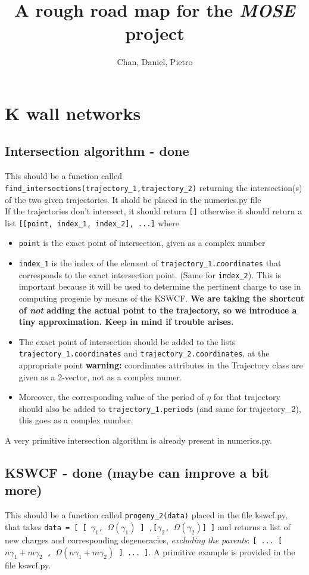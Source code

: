 \documentclass[11pt]{report}
\title{A rough road map for the \emph{MOSE} project}
\author{Chan, Daniel, Pietro}
\begin{document}
\maketitle

\tableofcontents


\chapter{K wall networks}


\section{Intersection algorithm  - {\color{red} \bf done}}
This should be a function called \texttt{find\_intersections(trajectory\_1,trajectory\_2)} returning the intersection(s) of the two given trajectories. It shold be placed in the numerics.py file\\
If the trajectories don't intersect, it should return {\tt []} otherwise it should return a list {\tt [[point, index\_1, index\_2], ...]} where
\begin{itemize}
\item {\tt point} is the exact point of intersection, given as a complex number 
\item {\tt index\_1} is the index of the element of {\tt trajectory\_1.coordinates} that corresponds to the exact intersection point. (Same for {\tt index\_2}). This is important because it will be used to determine the pertinent charge to use in computing progenie by means of the KSWCF. {\bf We are taking the shortcut of \emph{not} adding the actual point to the trajectory, so we introduce a tiny approximation. Keep in mind if trouble arises.}
\item The exact point of intersection should be added to the lists {\tt trajectory\_1.coordinates} and {\tt trajectory\_2.coordinates}, at the appropriate point {\bf warning:} coordinates attributes in the Trajectory class are given as a 2-vector, not as a complex numer. 
\item Moreover, the corresponding value of the period of $\eta$ for that trajectory should also be added to {\tt trajectory\_1.periods} (and same for trajectory\_2), this goes as a complex number.
\end{itemize}
A very primitive intersection algorithm is already present in numerics.py.



\section{KSWCF  - {\color{red} \bf done} {\tiny \bf (maybe can improve a bit more)}}
This should be a function called {\tt progeny\_2(data)} placed in the file kswcf.py, that takes {\tt data = [ [ $\gamma_{1}$, $\Omega(\gamma_{1})$  ] ,[$\gamma_{2}$, $\Omega(\gamma_{2})$] ]} and returns a list of new charges and corresponding degeneracies, \emph{excluding the parents}:
{\tt [ ...  [ $n \gamma_{1}+ m \gamma_{2}$ , $\Omega(n \gamma_{1}+ m \gamma_{2})$  ]  ... ]}.
A primitive example is provided in the file kswcf.py.
\end{document}
